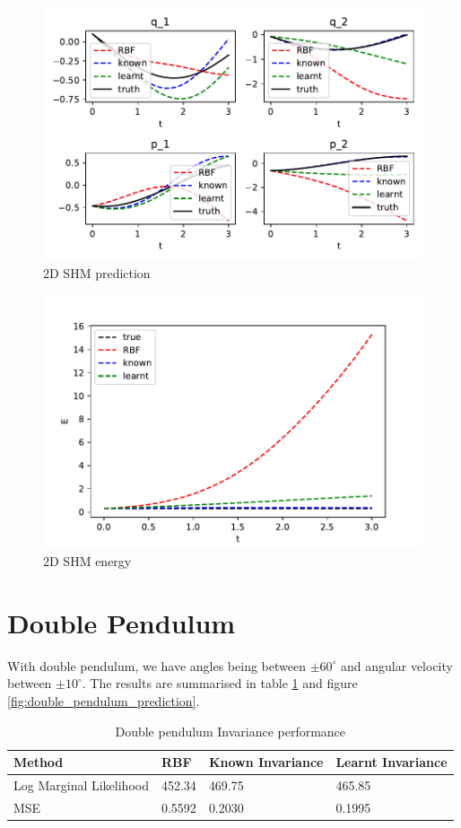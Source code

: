 \documentclass{statsmsc}
\begin{document}
\begin{figure}[H] 
  \includegraphics[width=0.6\linewidth]{../codes/figures/shm_2d_predicted.pdf}
  \centering
  \caption{2D SHM prediction}
  \label{fig:shm_2d_prediction}
\end{figure}

\begin{figure}[H] 
  \includegraphics[width=0.6\linewidth]{../codes/figures/shm_2d_energy.pdf}
  \centering
  \caption{2D SHM energy}
  \label{fig:shm_2d_energy}
\end{figure}

\section{Double Pendulum}
With double pendulum, we have angles being between $\pm 60^\circ$ and angular velocity between $\pm 10^\circ$.
The results are summarised in table \ref{tab:double_pendulum_performance} and figure \ref{fig:double_pendulum_prediction}.
\begin{table}[H]
  \centering
  \begin{tabular}{l l l l}
    \hline
Method           & RBF & Known Invariance&  Learnt Invariance\\
  \hline
    Log Marginal Likelihood & 452.34 & 469.75 & 465.85 \\
MSE & 0.5592 & 0.2030 & 0.1995 \\
    \hline
  \end{tabular}
  \caption{Double pendulum Invariance performance}
  \label{tab:double_pendulum_performance}
\end{table}
\end{document}
